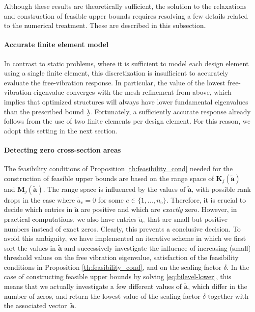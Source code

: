 \documentclass[final,onefignum,onetabnum]{siamart220329}
\begin{document}
Although these results are theoretically sufficient, the solution to the relaxations and construction of feasible upper bounds requires resolving a few details related to the numerical treatment. These are described in this subsection.

\paragraph{Accurate finite element model} In contrast to static problems, where it is sufficient to model each design element using a single finite element, this discretization is insufficient to accurately evaluate the free-vibration response. In particular, the value of the lowest free-vibration eigenvalue converges with the mesh refinement from above, which implies that optimized structures will always have lower fundamental eigenvalues than the prescribed bound $\underline{\lambda}$. Fortunately, a sufficiently accurate response already follows from the use of two finite elements per design element. For this reason, we adopt this setting in the next section.

\paragraph{Detecting zero cross-section areas} The {feasibility} conditions of Proposition \ref{th:feasibility_cond} needed for the construction of feasible upper bounds are based on the range space of $\mathbf{K}_j(\tilde{\mathbf{a}})$ and $\mathbf{M}_j(\tilde{\mathbf{a}})$. The range space is influenced by the values of $\tilde{\mathbf{a}}$, with possible rank drops in the case where $\tilde{a}_e = 0$ for some $e \in \{1,\dots,n_\mathrm{e}\}$. Therefore, it is crucial to decide which entries in $\tilde{\mathbf{a}}$ are positive and which are \textit{exactly} zero. However, in practical computations, we also have entries $\tilde{a}_e$ that are small but positive numbers instead of exact zeros. Clearly, this prevents a conclusive decision. To avoid this ambiguity, we have implemented an iterative scheme in which we first sort the values in $\tilde{\mathbf{a}}$ and successively investigate the influence of increasing (small) threshold values on the free vibration eigenvalue, satisfaction of the {feasibility} conditions in Proposition \ref{th:feasibility_cond}, and on the scaling factor $\delta$. In the case of constructing feasible upper bounds by solving \eqref{eq:bilevel-lower}, this means that we actually investigate a few different values of $\tilde{\mathbf{a}}$, which differ in the number of zeros, and return the lowest value of the scaling factor $\delta$ together with the associated vector~$\tilde{\mathbf{a}}$.
\end{document}
